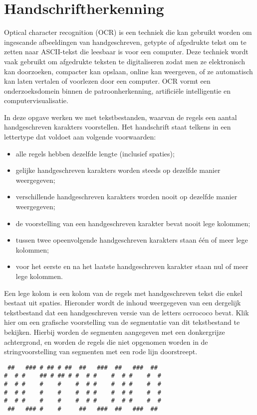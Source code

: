 
\section*{Handschriftherkenning}

Optical character recognition (OCR) is een techniek die kan gebruikt worden om
ingescande afbeeldingen van handgeschreven, getypte of afgedrukte tekst om te
zetten naar ASCII-tekst die leesbaar is voor een computer. Deze techniek wordt
vaak gebruikt om afgedrukte teksten te digitaliseren zodat men ze elektronisch
kan doorzoeken, compacter kan opslaan, online kan weergeven, of ze automatisch
kan laten vertalen of voorlezen door een computer. OCR vormt een
onderzoeksdomein binnen de patroonherkenning, artifici\"ele intelligentie en
computervisualisatie.

In deze opgave werken we met tekstbestanden, waarvan de regels een aantal
handgeschreven karakters voorstellen. Het handschrift staat telkens in een
lettertype dat voldoet aan volgende voorwaarden:

\begin{itemize}
    \item alle regels hebben dezelfde lengte (inclusief spaties);
    \item gelijke handgeschreven karakters worden steeds op dezelfde manier
        weergegeven;
    \item verschillende handgeschreven karakters worden nooit op dezelfde manier
        weergegeven;
    \item de voorstelling van een handgeschreven karakter bevat nooit lege
        kolommen;
    \item tussen twee opeenvolgende handgeschreven karakters staan \'e\'en of
        meer lege kolommen;
    \item voor het eerste en na het laatste handgeschreven karakter staan nul of
        meer lege kolommen.
\end{itemize}

Een lege kolom is een kolom van de regels met handgeschreven tekst die enkel
bestaat uit spaties. Hieronder wordt de inhoud weergegeven van een dergelijk
tekstbestand dat een handgeschreven versie van de letters ocrrococo bevat. Klik
hier om een grafische voorstelling van de segmentatie van dit tekstbestand te
bekijken. Hierbij worden de segmenten aangegeven met een donkergrijze
achtergrond, en worden de regels die niet opgenomen worden in de
stringvoorstelling van segmenten met een rode lijn doorstreept.

\begin{verbatim}
 ##   ### # ## # ##  ##   ###  ##   ###  ##
#  # #    ## # ## # #  # #    #  # #    #  #
#  # #    #    #    #  # #    #  # #    #  #
#  # #    #    #    #  # #    #  # #    #  #
#  # #    #    #    #  # #    #  # #    #  #
 ##   ### #    #     ##   ###  ##   ###  ##
\end{verbatim}

